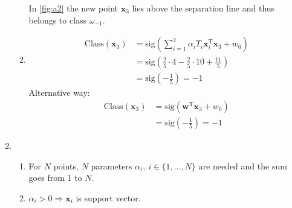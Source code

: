 \documentclass[DIN, pagenumber=false, fontsize=11pt, parskip=half]{scrartcl}
\begin{document}
\begin{enumerate}
\begin{enumerate}
            In \cref{fig:a2} the new point $\mathbf{x}_3$ lies above the separation line and thus belongs to class $\omega_{-1}$.
            \item
            \begin{align*}
                \text{Class}(\mathbf{x}_3) &= \text{sig}\left( \sum_{i=1}^2{\alpha_i T_i \mathbf{x}_i^\text{T} \mathbf{x}_3} + w_0 \right) \\
                &= \text{sig}\left( \frac{2}{5} \cdot 4 - \frac{2}{5} \cdot 10 + \frac{11}{5} \right) \\
                &= \text{sig}\left(-\frac{1}{5} \right) = -1
            \end{align*}
            Alternative way:
            \begin{align*}
                \text{Class}(\mathbf{x}_3) &= \text{sig}\left(\mathbf{w}^\text{T} \mathbf{x}_3 + w_0 \right) \\
                &= \text{sig}\left(-\frac{1}{5} \right) = -1
            \end{align*}
        \end{enumerate}
        \item
        \begin{enumerate}
            \item
            For $N$ points, $N$ parameters $\alpha_i, \ i \in \{1, \dots, N\}$ are needed and the sum goes from 1 to $N$.
            \item
            $\alpha_i > 0 \Rightarrow \mathbf{x}_i$ is support vector.
        \end{enumerate}
    \end{enumerate}
    
\end{document}
